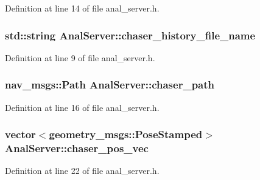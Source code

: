 Definition at line 14 of file anal\+\_\+server.\+h.

\subsubsection[{\texorpdfstring{chaser\+\_\+history\+\_\+file\+\_\+name}{chaser_history_file_name}}]{\setlength{\rightskip}{0pt plus 5cm}std\+::string Anal\+Server\+::chaser\+\_\+history\+\_\+file\+\_\+name}\hypertarget{class_anal_server_ab916cca9794227a265d411fecadd7110}{}\label{class_anal_server_ab916cca9794227a265d411fecadd7110}


Definition at line 9 of file anal\+\_\+server.\+h.

\subsubsection[{\texorpdfstring{chaser\+\_\+path}{chaser_path}}]{\setlength{\rightskip}{0pt plus 5cm}nav\+\_\+msgs\+::\+Path Anal\+Server\+::chaser\+\_\+path}\hypertarget{class_anal_server_a93990e437aae2dd4a8b9a320c88056e2}{}\label{class_anal_server_a93990e437aae2dd4a8b9a320c88056e2}


Definition at line 16 of file anal\+\_\+server.\+h.

\subsubsection[{\texorpdfstring{chaser\+\_\+pos\+\_\+vec}{chaser_pos_vec}}]{\setlength{\rightskip}{0pt plus 5cm}vector$<$geometry\+\_\+msgs\+::\+Pose\+Stamped$>$ Anal\+Server\+::chaser\+\_\+pos\+\_\+vec}\hypertarget{class_anal_server_aa3d74bff2f9b08b78148ec2d6dbc0af4}{}\label{class_anal_server_aa3d74bff2f9b08b78148ec2d6dbc0af4}


Definition at line 22 of file anal\+\_\+server.\+h.

